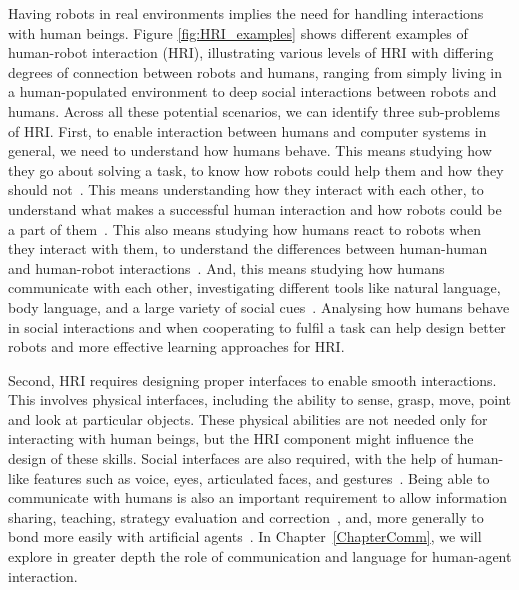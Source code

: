 Having robots in real environments implies the need for handling interactions with human beings. Figure \ref{fig:HRI_examples} shows different examples of human-robot interaction (HRI), illustrating various levels of HRI with differing degrees of connection between robots and humans, ranging from simply living in a human-populated environment to deep social interactions between robots and humans. Across all these potential scenarios, we can identify three sub-problems of HRI. First, to enable interaction between humans and computer systems in general, we need to understand how humans behave. This means studying how they go about solving a task, to know how robots could help them and how they should not~\citep{Shih2021_ConventionsHumanAI}. This means understanding how they interact with each other, to understand what makes a successful human interaction and how robots could be a part of them~\citep{Tseng2016_ServiceRobot}. This also means studying how humans react to robots when they interact with them, to understand the differences between human-human and human-robot interactions~\citep{Jung2020_TowerConstruct, Roesler2024_HumanRobotTrust}. And, this means studying how humans communicate with each other, investigating different tools like natural language, body language, and a large variety of social cues~\citep{Feine2019_SocialCues}. 
Analysing how humans behave in social interactions and when cooperating to fulfil a task can help design better robots and more effective learning approaches for HRI.

Second, HRI requires designing proper interfaces to enable smooth interactions. This involves physical interfaces, including the ability to sense, grasp, move, point and look at particular objects. These physical abilities are not needed only for interacting with human beings, but the HRI component might influence the design of these skills. Social interfaces are also required, with the help of human-like features such as voice, eyes, articulated faces, and gestures~\citep{Zlotowski2014_Anthropomorphism}. Being able to communicate with humans is also an important requirement to allow information sharing, teaching, strategy evaluation and correction~\citep{Mikolov2018_RoadmapMachineIntell, Crandall2018_CoopWithMachines}, and, more generally to bond more easily with artificial agents~\citep{Liu2022_ChildChatbotReading}. In Chapter~\ref{ChapterComm}, we will explore in greater depth the role of communication and language for human-agent interaction. 

